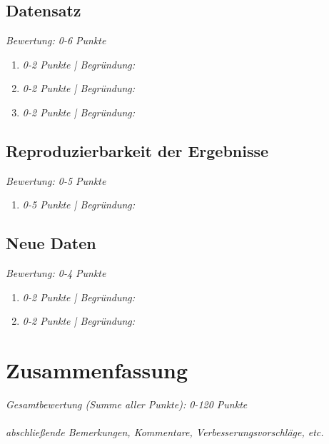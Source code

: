 \documentclass[deutsch, paper=a4]{scrartcl}
\begin{document}
\subsection{Datensatz}
\textit{Bewertung: 0-6 Punkte}\\
\begin{enumerate}[label=\alph*)]
\item \textit{0-2 Punkte | Begründung: }
\item \textit{0-2 Punkte | Begründung: }
\item \textit{0-2 Punkte | Begründung: }
\end{enumerate}

\subsection{Reproduzierbarkeit der Ergebnisse}
\textit{Bewertung: 0-5 Punkte}\\
\begin{enumerate}[label=\alph*)]
\item \textit{0-5 Punkte | Begründung: }
\end{enumerate}

\subsection{Neue Daten}
\textit{Bewertung: 0-4 Punkte}\\
\begin{enumerate}[label=\alph*)]
\item  \textit{0-2 Punkte | Begründung: }
\item \textit{0-2 Punkte | Begründung: }
\end{enumerate}

\section{Zusammenfassung}
\label{sec:summary}
\textit{Gesamtbewertung (Summe aller Punkte): 0-120 Punkte}\\
\\
\textit{abschließende Bemerkungen, Kommentare, Verbesserungsvorschläge, etc. }
\end{document}
